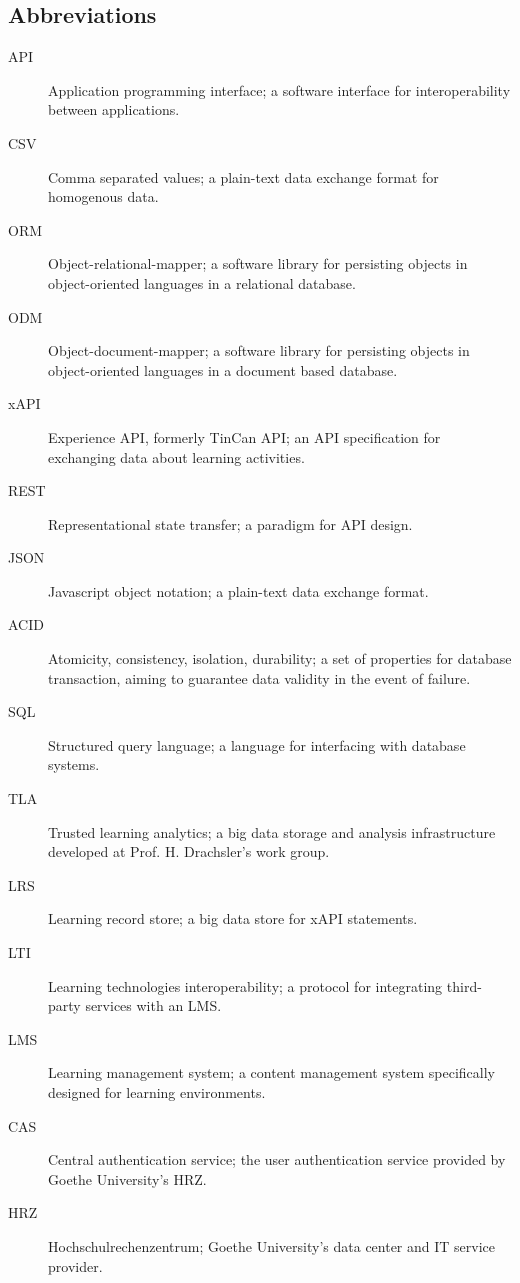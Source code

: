 \documentclass[a4paper,11pt]{article}
\begin{document}
            \subsection{Abbreviations}
                \begin{description}
                    \item[API] Application programming interface; a software interface for
                    interoperability between applications.
                    \item[CSV] Comma separated values; a plain-text data exchange format for homogenous
                    data.
                    \item[ORM] Object-relational-mapper; a software library for persisting objects
                    in object-oriented languages in a relational database.
                    \item[ODM] Object-document-mapper; a software library for persisting objects
                    in object-oriented languages in a document based database.
                    \item[xAPI] Experience API, formerly TinCan API; an API specification for
                    exchanging data about learning activities.
                    \item[REST] Representational state transfer; a paradigm for API design.
                    \item[JSON] Javascript object notation; a plain-text data exchange format.
                    \item[ACID] Atomicity, consistency, isolation, durability; a set of properties
                    for database transaction, aiming to guarantee data validity in the event of failure.
                    \item[SQL] Structured query language; a language for interfacing with database systems.
                    \item[TLA] Trusted learning analytics; a big data storage and analysis infrastructure
                    developed at Prof. H. Drachsler's work group.
                    \item[LRS] Learning record store; a big data store for xAPI statements.
                    \item[LTI] Learning technologies interoperability; a protocol for integrating third-party
                    services with an LMS.
                    \item[LMS] Learning management system; a content management system specifically
                    designed for learning environments.
                    \item[CAS] Central authentication service; the user authentication service provided
                    by Goethe University's HRZ.
                    \item[HRZ] Hochschulrechenzentrum; Goethe University's data center and IT service provider.
                \end{description}


        \pagebreak
        \listoffigures
        \listoftables
        
        
    
    
\end{document}
